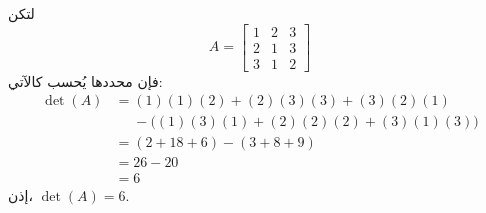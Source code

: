 	\begin{example}
		لتكن
		\[
		A=
		\begin{bmatrix}
			1 & 2 & 3 \\
			2 & 1 & 3 \\
			3 & 1 & 2
		\end{bmatrix}
		\]
		فإن محددها يُحسب كالآتي:
		\begin{align*}
			\det(A) &= 
			(1)(1)(2) + (2)(3)(3) + (3)(2)(1) \\
			&\phantom{=} - \big((1)(3)(1) + (2)(2)(2) + (3)(1)(3)\big) \\
			&= (2 + 18 + 6) - (3 + 8 + 9) \\
			&= 26 - 20 \\
			&= 6
		\end{align*}
		إذن، \(\det(A) = 6\).
	\end{example}
	